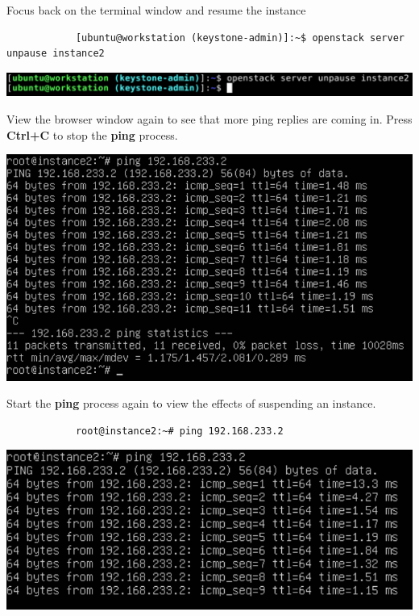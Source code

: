 \documentclass[letterpaper, 12pt]{article}
\begin{document}
\begin{enumerate}
    \begin{labstep}
        Focus back on the terminal window and resume the instance
        \begin{lstlisting}
            [ubuntu@workstation (keystone-admin)]:~$ openstack server unpause instance2
        \end{lstlisting}

        \begin{center}
            \includegraphics[width=\linewidth]{images/part4/step7.png}
        \end{center}
    \end{labstep}

    \begin{labstep}
        View the browser window again to see that more ping replies are coming in.
        Press \textbf{Ctrl+C} to stop the \textbf{ping} process.

        \begin{center}
            \includegraphics[width=\linewidth]{images/part4/step8.png}
        \end{center}
    \end{labstep}

    \begin{labstep}
        Start the \textbf{ping} process again to view the effects of suspending an instance.
        \begin{lstlisting}
            root@instance2:~# ping 192.168.233.2
        \end{lstlisting}

        \begin{center}
            \includegraphics[width=\linewidth]{images/part4/step9.png}
        \end{center}
    \end{labstep}


\end{enumerate}
\end{document}
